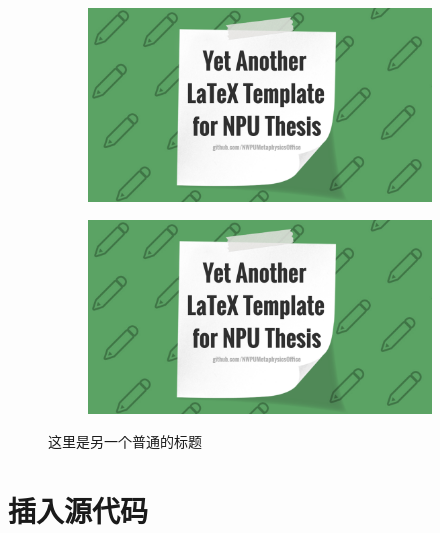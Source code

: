 \documentclass[lang=chs, degree=phd, blindreview=false, adobe=true]{yanputhesis}
\begin{document}
\begin{figure}[htb]
    \centering
    \begin{minipage}[t]{0.96\textwidth}
        \centering
        \begin{subfigure}[t]{0.47\textwidth}
            \centering
            \includegraphics[scale=0.1]{poster.png}
            \caption{\label{subfig:example2-subfig1}}
        \end{subfigure}
        \begin{subfigure}[t]{0.47\textwidth}
            \centering
            \includegraphics[scale=0.1]{poster.png}
            \caption{\label{subfig:example2-subfig2}}
        \end{subfigure}
    \end{minipage}
    \caption{这里是另一个普通的标题}
    \label{fig:example2}
\end{figure}

\section{插入源代码}
\end{document}
